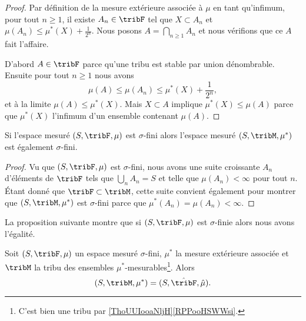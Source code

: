 \begin{proof}
    Par définition de la mesure extérieure associée à \( \mu\) en tant qu'infimum, pour tout \( n\geq 1\), il existe \( A_n\in\tribF\) tel que \( X\subset A_n\) et \( \mu(A_n)\leq \mu^*(X)+\frac{1}{ 2^n }\). Nous posons \( A=\bigcap_{n\geq 1}A_n\) et nous vérifions que ce \( A\) fait l'affaire.

    D'abord \( A\in\tribF\) parce qu'une tribu est stable par union dénombrable. Ensuite pour tout \( n\geq 1\) nous avons
    \begin{equation}
        \mu(A)\leq \mu(A_n)\leq \mu^*(X)+\frac{1}{ 2^n },
    \end{equation}
    et à la limite \( \mu(A)\leq \mu^*(X)\). Mais \( X\subset A\) implique \( \mu^*(X)\leq \mu(A)\) parce que \( \mu^*(X)\) l'infimum d'un ensemble contenant \( \mu(A)\).
\end{proof}

\begin{lemma}       \label{LemOAEoocBDaO}
    Si l'espace mesuré \( (S,\tribF,\mu)\) est \( \sigma\)-fini alors l'espace mesuré \( (S,\tribM,\mu^*)\) est également \( \sigma\)-fini.
\end{lemma}

\begin{proof}
    Vu que \( (S,\tribF,\mu)\) est \( \sigma\)-fini, nous avons une suite croissante \( A_n\) d'éléments de \( \tribF\) tels que \( \bigcup_nA_n=S\) et telle que \( \mu(A_n)<\infty\) pour tout \( n\). Étant donné que \( \tribF\subset\tribM\), cette suite convient également pour montrer que \( (S,\tribM,\mu^*)\) est \( \sigma\)-fini parce que \( \mu^*(A_n)=\mu(A_n)<\infty\).
\end{proof}

La proposition suivante montre que si \( (S,\tribF,\mu)\) est \( \sigma\)-finie alors nous avons l'égalité.
\begin{proposition} \label{PropIIHooAIbfj}
    Soit \( (S,\tribF,\mu)\) un espace mesuré \( \sigma\)-fini, \( \mu^*\) la mesure extérieure associée et \( \tribM\) la tribu des ensembles \( \mu^*\)-mesurables\footnote{C'est bien une tribu par \ref{ThoUUIooaNljH}\ref{RPPooHSWWsi}.}. Alors 
    \begin{equation}
    (S,\tribM,\mu^*) = (S,\hat\tribF,\hat\mu).
    \end{equation}
\end{proposition}

